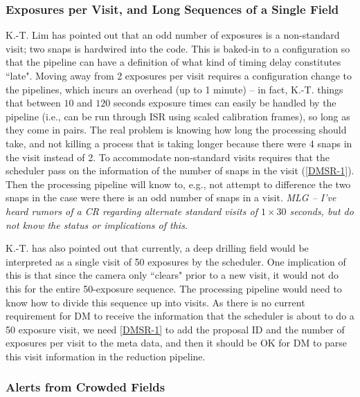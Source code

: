 \documentclass[DM,lsstdraft,toc]{lsstdoc}
\begin{document}
\subsubsection{Exposures per Visit, and Long Sequences of a Single Field}

K.-T. Lim has pointed out that an odd number of exposures is a non-standard visit; two snaps is hardwired into the code. This is baked-in to a configuration so that the pipeline can have a definition of what kind of timing delay constitutes ``late".  Moving away from 2 exposures per visit requires a configuration change to the pipelines, which incurs an overhead (up to 1 minute) -- in fact, K.-T. things that between $10$ and $120$ seconds exposure times can easily be handled by the pipeline (i.e., can be run through ISR using scaled calibration frames), so long as they come in pairs. The real problem is knowing how long the processing should take, and not killing a process that is taking longer because there were 4 snaps in the visit instead of 2. To accommodate non-standard visits requires that the scheduler pass on the information of the number of snaps in the visit (\ref{DMSR-1}). Then the processing pipeline will know to, e.g., not attempt to difference the two snaps in the case were there is an odd number of snaps in a visit. \textit{MLG -- I've heard rumors of a CR regarding alternate standard visits of $1\times30$ seconds, but do not know the status or implications of this.}

K.-T. has also pointed out that currently, a deep drilling field would be interpreted as a single visit of 50 exposures by the scheduler. One implication of this is that since the camera only ``clears" prior to a new visit, it would not do this for the entire 50-exposure sequence. The processing pipeline would need to know how to divide this sequence up into visits. As there is no current requirement for DM to receive the information that the scheduler is about to do a 50 exposure visit, we need \ref{DMSR-1} to add the proposal ID and the number of exposures per visit to the meta data, and then it should be OK for DM to parse this visit information in the reduction pipeline.

\subsubsection{Alerts from Crowded Fields}
\end{document}
